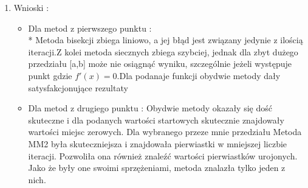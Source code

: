 \documentclass[a4paper, 11pt]{article}
\begin{document}
\begin{enumerate}
\begin{itemize}
\begin{table}[p]
\caption{Wyniki metody Mullera cz. 6}                                                                
\label{table:Wyniki metody Mullera cz. 6}                                                            
\end{table}    
\end{itemize}
\item Wnioski : 
\begin{itemize}
\item Dla metod z pierwszego punktu : \\* Metoda bisekcji zbiega liniowo, a jej błąd jest związany jedynie z ilością iteracji.Z kolei metoda siecznych zbiega szybciej, jednak dla zbyt dużego przedziału [a,b] może nie osiągnąć wyniku, szczególnie jeżeli występuje punkt gdzie \( f'(x) = 0\).Dla podanaje funkcji obydwie metody dały satysfakcjonujące rezultaty
\item Dla metod z drugiego punktu : Obydwie metody okazały się dość skuteczne i dla podanych wartości startowych skutecznie znajdowały wartości miejsc zerowych. Dla wybranego przeze mnie przedziału Metoda MM2 była skuteczniejsza i znajdowała pierwiastki w mniejszej liczbie iteracji. Pozwoliła ona również znaleźć wartości pierwiastków urojonych. Jako że były one swoimi sprzężeniami, metoda znalazła tylko jeden z nich.
\end{itemize}
\end{enumerate}
\end{document}
